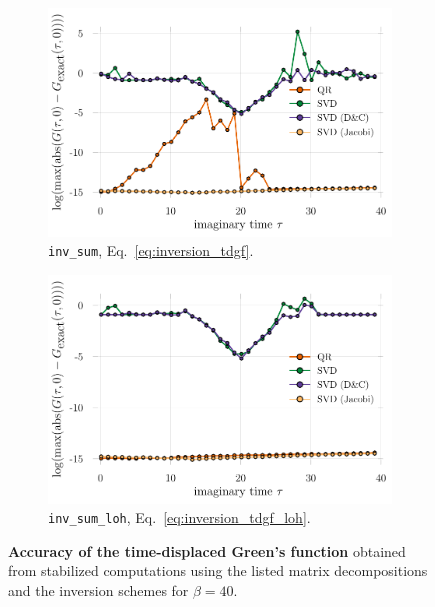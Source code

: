 \documentclass[submission, Phys]{SciPost}
\begin{document}
\begin{figure}[b]
	\centering
	\begin{subfigure}{0.48\textwidth}
		\includegraphics[width=\textwidth]{figures/accuracy_tdgf_U0.pdf}
		\caption{\texttt{inv\_sum}, Eq.~\eqref{eq:inversion_tdgf}. \label{fig:tdgf_accuracy_regularinv}}
	\end{subfigure}%
	\hspace{10pt}
	\begin{subfigure}{0.48\textwidth}
		\includegraphics[width=\textwidth]{figures/accuracy_tdgf_loh_U0.pdf}
		\caption{\texttt{inv\_sum\_loh}, Eq.~\eqref{eq:inversion_tdgf_loh}. \label{fig:tdgf_accuracy_loh}}
	\end{subfigure}
	\vspace{5pt}
	\caption{\textbf{Accuracy of the time-displaced Green's function} obtained from stabilized computations using the listed matrix decompositions and the inversion schemes for $\beta = 40$.}
\end{figure}
\end{document}
